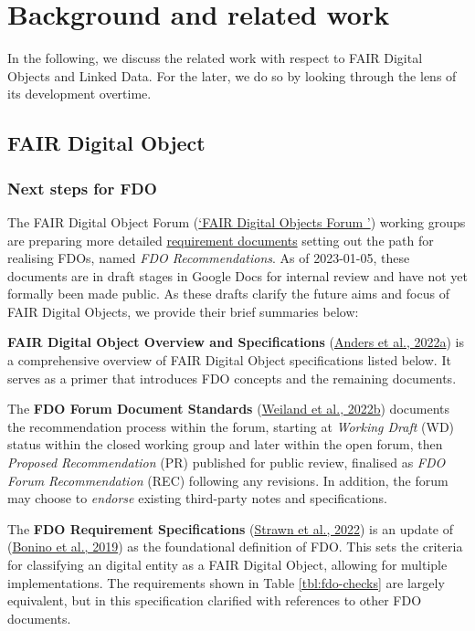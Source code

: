 \hypertarget{sec:background}{%
\section{Background and related work}\label{sec:background}}

In the following, we discuss the related work with respect to FAIR Digital Objects and Linked Data. For the later, we do so by looking through the lens of its development overtime.

\hypertarget{sec:fdo}{%
\subsection{FAIR Digital Object}\label{sec:fdo}}

\hypertarget{sec:next-step-fdo}{%
\subsubsection{Next steps for FDO}\label{sec:next-step-fdo}}

The FAIR Digital Object Forum (\protect\hyperlink{ref-DMEBhHID}{{`FAIR Digital Objects Forum \textbar{}'}}) working groups are preparing more detailed \href{https://docs.google.com/spreadsheets/d/1O1PTLmVWqjQgvJsIcPgaZJe9BntHZt8_QndEG0eRwUY/edit}{requirement documents} setting out the path for realising FDOs, named \emph{FDO Recommendations}. As of 2023-01-05, these documents are in draft stages in Google Docs for internal review and have not yet formally been made public. As these drafts clarify the future aims and focus of FAIR Digital Objects, we provide their brief summaries below:

\textbf{FAIR Digital Object Overview and Specifications} (\protect\hyperlink{ref-11NpETLq1}{Anders et al., 2022a}) is a comprehensive overview of FAIR Digital Object specifications listed below. It serves as a primer that introduces FDO concepts and the remaining documents.

The \textbf{FDO Forum Document Standards} (\protect\hyperlink{ref-TQdku4YF}{Weiland et al., 2022b}) documents the recommendation process within the forum, starting at \emph{Working Draft} (WD) status within the closed working group and later within the open forum, then \emph{Proposed Recommendation} (PR) published for public review, finalised as \emph{FDO Forum Recommendation} (REC) following any revisions. In addition, the forum may choose to \emph{endorse} existing third-party notes and specifications.

The \textbf{FDO Requirement Specifications} (\protect\hyperlink{ref-yygVPoL0}{Strawn et al., 2022}) is an update of (\protect\hyperlink{ref-RwvirqWg}{Bonino et al., 2019}) as the foundational definition of FDO. This sets the criteria for classifying an digital entity as a FAIR Digital Object, allowing for multiple implementations. The requirements shown in Table \ref{tbl:fdo-checks} are largely equivalent, but in this specification clarified with references to other FDO documents.

